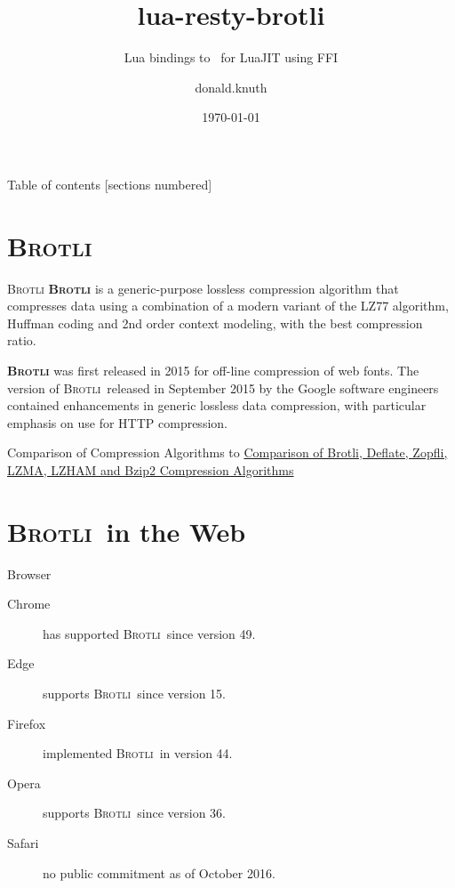 \documentclass[11pt]{beamer}
\title{lua-resty-brotli}
\subtitle{Lua bindings to \brotli\ for LuaJIT using FFI}
\date{\today}
\author{donald.knuth}
\def\brotli{\textsc{Brotli}}
\newcommand{\gamename}{\textbf{\brotli}\xspace}
\begin{document}
\maketitle

\begin{frame}{Table of contents}
  [sections numbered]
  \tableofcontents[hideallsubsections]
\end{frame}

\section{\brotli}

\begin{frame}[fragile]{\brotli}
  \gamename is a \alert{generic-purpose lossless compression} algorithm that compresses data
  using a combination of a modern variant of the LZ77 algorithm, Huffman coding and
  2nd order context modeling, with the best compression ratio.

  \gamename was first released in 2015 for off-line compression of
  \alert{web fonts.} The version of \brotli\ released in September 2015
  by the Google software engineers contained enhancements in generic
  lossless data compression, with particular emphasis on use for \alert{HTTP compression.}
\end{frame}

\begin{frame}{Comparison of Compression Algorithms}
  \vskip 3mm
  \hbox to
  \vskip-4mm
  \href{https://cran.r-project.org/web/packages/brotli/vignettes/brotli-2015-09-22.pdf}
    {\alert{\scriptsize Comparison of Brotli, Deflate, Zopfli, LZMA, LZHAM
and Bzip2 Compression Algorithms}}

\end{frame}

\section{\brotli\ in the Web}

\begin{frame}{Browser}
  \begin{description}
  \item [Chrome] has supported \brotli\ since version 49.
  \item [Edge] supports \brotli\ since version 15.
  \item [Firefox] implemented \brotli\ \alert{in} version 44.
  \item [Opera] supports \brotli\ since version 36.
  \item [Safari] no public commitment as of October 2016.
  \end{description}
\end{frame}
\end{document}
